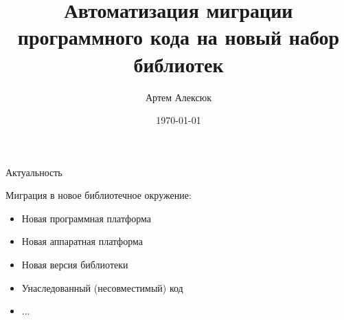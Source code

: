 \documentclass[12pt]{beamer}
\title{Автоматизация миграции программного кода на новый набор библиотек}
\date{\today}
\author{Артем Алексюк}
\institute{Санкт-Петербургский политехнический университет Петра Великого \\
JetBrains Research}
\begin{document}
\maketitle




{
\begin{frame}{Актуальность}
\begin{mybox}[]
Миграция в новое библиотечное окружение:
\begin{itemize}
	\item Новая программная платформа
	\item Новая аппаратная платформа
	\item Новая версия библиотеки
	\item Унаследованный (несовместимый) код 
	\item ...		
\end{itemize}
\end{mybox}
\end{frame}
}
\end{document}
